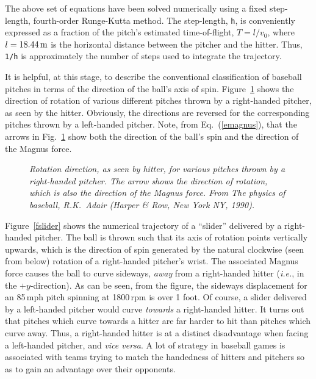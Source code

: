 The above set of equations have been solved numerically using a fixed step-length, fourth-order
Runge-Kutta method. The step-length, {\tt h}, is conveniently expressed as a fraction of the
pitch's  estimated
time-of-flight, $T = l/v_0$, where $l=18.44\,{\rm m}$ is the horizontal
distance between the pitcher and the hitter. Thus, {\tt 1/h} is approximately the number
of steps used to integrate the trajectory. 

It is helpful, at this stage, to describe the conventional classification of baseball
pitches in terms of the  direction of the ball's
axis of spin. Figure~\ref{fpitch} shows the direction of rotation of
various different pitches thrown by a right-handed
pitcher, as seen by the hitter. Obviously, the directions are reversed for the
corresponding pitches thrown by a left-handed pitcher. Note, from Eq.~(\ref{emagnus}),
that the arrows in Fig.~\ref{fpitch} show both the direction of the ball's spin and
the direction of the Magnus force. 

\begin{figure}
\epsfysize=2.25in
\centerline{}
\caption{\em Rotation direction, as seen by hitter, for various 
pitches thrown by a  right-handed pitcher. The arrow shows the direction of
rotation, which is also the direction of the Magnus force. From
{\em The physics of baseball}, R.K.~Adair (Harper \& Row, New York NY, 1990).}\label{fpitch}
\end{figure}

Figure~\ref{fslider} shows the numerical trajectory of a ``slider'' delivered
by a right-handed pitcher. The ball is thrown such that its axis
of rotation points vertically upwards, which is the direction of spin generated by
 the natural clockwise (seen from below) rotation of a right-handed pitcher's wrist.
The associated Magnus force causes the
ball to curve sideways, {\em away}\/ from a right-handed hitter ({\em i.e.}, in the
$+y$-direction). As can be seen, from the figure, the sideways displacement 
for an 85\,mph pitch spinning at
1800\,rpm  is over 1 foot. Of course, a slider delivered
by a left-handed pitcher would curve {\em towards}\/ a right-handed hitter.
It turns out that pitches which curve towards a hitter are far harder to
hit  than pitches which curve away. Thus, a right-handed
hitter is at a distinct disadvantage when facing a left-handed pitcher, and
{\em vice versa}. A lot of strategy in  baseball games is
associated with teams trying to match the handedness of hitters and
pitchers so as to gain an advantage over their opponents.

